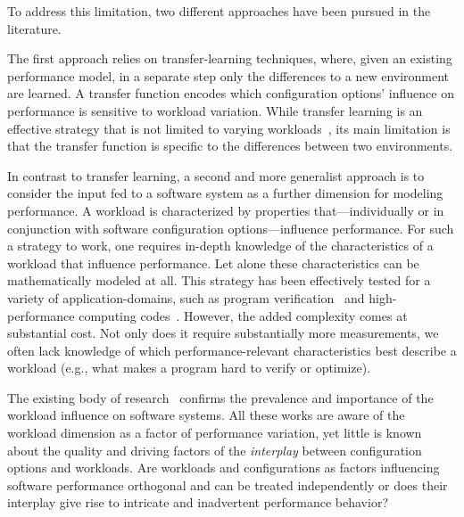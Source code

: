 To address this limitation, two different approaches have been pursued in the literature. 

The first approach relies on transfer-learning techniques, where, given an existing performance model, in a separate step only the differences to a new environment are learned. A transfer function encodes which configuration options’ influence on performance is sensitive to workload variation. While transfer learning is an effective strategy that is not limited to varying workloads~\cite{jamshidi_learning_2018,jamishidi_transfer_2017,jamshidi_transfer_gp_2017,martin_transfer_2021,ding_bayesian_2020}, its main limitation is that the transfer function is specific to the differences between two environments.

In contrast to transfer learning, a second and more generalist approach is to consider the input fed to a software system as a further dimension for modeling performance. A workload is characterized by properties that---individually or in conjunction with software configuration options---influence performance. For such a strategy to work, one requires in-depth knowledge of the characteristics of a workload that influence performance. Let alone these characteristics can be mathematically modeled at all. This strategy has been effectively tested for a  variety of application-domains, such as program verification~\cite{koc_satune_2021} and high-performance computing codes~\cite{exastencils2014}. However, the added complexity comes at substantial cost. 
Not only does it require substantially more measurements, we often lack knowledge of which performance-relevant characteristics best describe a workload (e.g., what makes a program hard to verify or optimize).

The existing body of research~\cite{dorn2020,siegmundPerformanceinfluenceModelsHighly2015,haDeepPerf2019,perfAL,guoVariabilityawarePerformancePrediction2013,sarkarCostEfficientSamplingPerformance,guo_2018_data,fourier_learning_2015,perLasso,chen_hinnperf_2022,chen_mmo_2021,nairUsingBadLearners2017,nairFlash18,ohFindingNearoptimalConfigurations2017} confirms the prevalence and importance of the workload influence on software systems. All these works are aware of the workload dimension as a factor of performance variation, yet little is known about the quality and driving factors of the \emph{interplay} between configuration options and workloads. Are workloads and configurations as factors influencing software performance orthogonal and can be treated independently or does their interplay give rise to intricate and inadvertent performance behavior?

